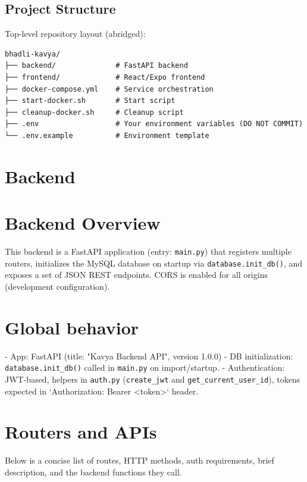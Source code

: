 \documentclass[11pt]{article}
\begin{document}
\subsection{Project Structure}
Top-level repository layout (abridged):
\begin{Verbatim}[fontsize=\small]
bhadli-kavya/
├── backend/              # FastAPI backend
├── frontend/             # React/Expo frontend
├── docker-compose.yml    # Service orchestration
├── start-docker.sh       # Start script
├── cleanup-docker.sh     # Cleanup script
├── .env                  # Your environment variables (DO NOT COMMIT)
└── .env.example          # Environment template
\end{Verbatim}


\newpage

\section{Backend}

\section*{Backend Overview}
This backend is a FastAPI application (entry: \texttt{main.py}) that registers multiple routers, initializes the MySQL database on startup via \texttt{database.init\_db()}, and exposes a set of JSON REST endpoints. CORS is enabled for all origins (development configuration).

\section*{Global behavior}
- App: FastAPI (title: "Kavya Backend API", version 1.0.0)
- DB initialization: \texttt{database.init\_db()} called in \texttt{main.py} on import/startup.
- Authentication: JWT-based, helpers in \texttt{auth.py} (\texttt{create\_jwt} and \texttt{get\_current\_user\_id}), tokens expected in `Authorization: Bearer <token>` header.

\section*{Routers and APIs}
Below is a concise list of routes, HTTP methods, auth requirements, brief description, and the backend functions they call.
\end{document}
